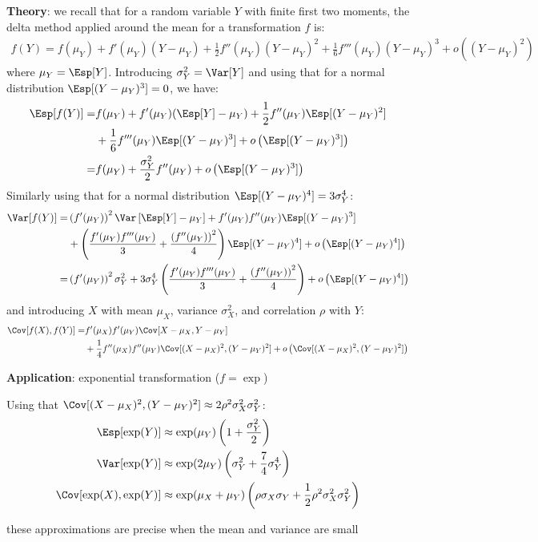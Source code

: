 \documentclass[12pt]{article}
\newcommand\Warning[1][3ex]{%
\renewcommand\stacktype{L}%
\scaleto{\stackon[1.3pt]{\color{red}$\triangle$}{\tiny\bfseries !}}{#1}%
\xspace
}
\begin{document}
\textbf{Theory}: we recall that for a random variable \(Y\) with finite first two
moments, the delta method applied around the mean for a transformation
\(f\) is:
\begin{align*}
f(Y) = f(\mu_Y) + f'(\mu_Y) (Y-\mu_Y) + \frac{1}{2} f''(\mu_Y) (Y-\mu_Y)^2  + \frac{1}{6} f'''(\mu_Y) (Y-\mu_Y)^3 + o\left((Y-\mu_Y)^2\right)
\end{align*}
where \(\mu_Y=\Esp[Y]\). Introducing \(\sigma_Y^2 = \Var[Y]\) and using
that for a normal distribution \(\Esp[(Y-\mu_Y)^3]=0\), we have:
\begin{align*}
\Esp[f(Y)] =& f(\mu_Y) + f'(\mu_Y) (\Esp[Y]-\mu_Y) + \frac{1}{2} f''(\mu_Y) \Esp[(Y-\mu_Y)^2] \\ &+ \frac{1}{6} f'''(\mu_Y) \Esp[(Y-\mu_Y)^3] + o\left(\Esp[(Y-\mu_Y)^3]\right) \\
=& f(\mu_Y) + \frac{\sigma_Y^2}{2} f''(\mu_Y)  + o\left(\Esp[(Y-\mu_Y)^3]\right)
\end{align*}
Similarly using that for a normal distribution \(\Esp[(Y-\mu_Y)^4]=3\sigma_Y^4\):
\begin{align*}
\Var[f(Y)] =& \left(f'(\mu_Y)\right)^2 \Var\left[\Esp[Y]-\mu_Y\right] + f'(\mu_Y)f''(\mu_Y) \Esp[(Y-\mu_Y)^3] \\
& +\left(\frac{f'(\mu_Y) f'''(\mu_Y)}{3} + \frac{\left(f''(\mu_Y)\right)^2}{4}\right) \Esp[(Y-\mu_Y)^4] + o\left(\Esp[(Y-\mu_Y)^4]\right) \\
=& \left(f'(\mu_Y)\right)^2 \sigma_Y^2 + 3 \sigma_Y^4 \left(\frac{f'(\mu_Y) f'''(\mu_Y)}{3} + \frac{\left(f''(\mu_Y)\right)^2}{4}\right) + o\left(\Esp[(Y-\mu_Y)^4]\right) 
\end{align*}
and introducing \(X\) with mean \(\mu_X\), variance \(\sigma_X^2\), and correlation \(\rho\) with \(Y\):
\begin{align*}
\Cov[f(X),f(Y)] =& f'(\mu_X) f'(\mu_Y) \Cov[X-\mu_X,Y-\mu_Y] \\ &+ \frac{1}{4} f''(\mu_X) f''(\mu_Y) \Cov[(X-\mu_X)^2,(Y-\mu_Y)^2] + o\left(\Cov[(X-\mu_X)^2,(Y-\mu_Y)^2]\right)
\end{align*}

\bigskip

\textbf{Application}:  exponential transformation (\(f = \exp\))

\bigskip

Using that \(\Cov[(X-\mu_X)^2,(Y-\mu_Y)^2]\approx2 \rho^2 \sigma_X^2 \sigma_Y^2\):
\begin{align*}
\Esp[\exp(Y)] &\approx \exp(\mu_Y)\left(1 + \frac{\sigma_Y^2}{2}\right) \\
\Var[\exp(Y)] &\approx \exp(2\mu_Y)\left(\sigma_Y^2 + \frac{7}{4} \sigma_Y^4\right)\\
\Cov[\exp(X),\exp(Y)] &\approx \exp(\mu_X+\mu_Y)\left(\rho \sigma_X \sigma_Y + \frac{1}{2} \rho^2 \sigma_X^2 \sigma_Y^2\right) 
\end{align*}
\Warning these approximations are precise when the mean and variance are small
\end{document}
